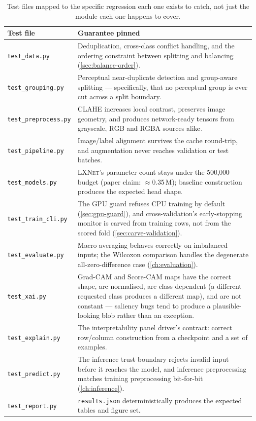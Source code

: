 \documentclass[11pt,a4paper,oneside]{report}
\newcommand{\LXNet}{\textsc{LXNet}}
\newcommand{\code}[1]{\texttt{\small #1}}
\begin{document}
\begin{table}[h]
\centering
\small
\begin{tabularx}{\linewidth}{@{}l X@{}}
\toprule
\textbf{Test file} & \textbf{Guarantee pinned} \\
\midrule
\code{test\_data.py} & Deduplication, cross-class conflict handling, and
  the ordering constraint between splitting and balancing
  (\cref{sec:balance-order}). \\
\code{test\_grouping.py} & Perceptual near-duplicate detection and
  group-aware splitting --- specifically, that no perceptual group is ever
  cut across a split boundary. \\
\code{test\_preprocess.py} & CLAHE increases local contrast, preserves
  image geometry, and produces network-ready tensors from grayscale, RGB
  and RGBA sources alike. \\
\code{test\_pipeline.py} & Image/label alignment survives the cache
  round-trip, and augmentation never reaches validation or test batches. \\
\code{test\_models.py} & \LXNet{}'s parameter count stays under the
  500{,}000 budget (paper claim: $\approx$0.35\,M); baseline construction
  produces the expected head shape. \\
\code{test\_train\_cli.py} & The GPU guard refuses CPU training by
  default (\cref{sec:gpu-guard}), and cross-validation's early-stopping
  monitor is carved from training rows, not from the scored fold
  (\cref{sec:carve-validation}). \\
\code{test\_evaluate.py} & Macro averaging behaves correctly on imbalanced
  inputs; the Wilcoxon comparison handles the degenerate all-zero-difference
  case (\cref{ch:evaluation}). \\
\code{test\_xai.py} & Grad-CAM and Score-CAM maps have the correct shape,
  are normalised, are class-dependent (a different requested class produces
  a different map), and are not constant --- saliency bugs tend to produce a
  plausible-looking blob rather than an exception. \\
\code{test\_explain.py} & The interpretability panel driver's contract:
  correct row/column construction from a checkpoint and a set of examples. \\
\code{test\_predict.py} & The inference trust boundary rejects invalid
  input before it reaches the model, and inference preprocessing matches
  training preprocessing bit-for-bit (\cref{ch:inference}). \\
\code{test\_report.py} & \texttt{results.json} deterministically produces
  the expected tables and figure set. \\
\bottomrule
\end{tabularx}
\caption{Test files mapped to the specific regression each one exists to
catch, not just the module each one happens to cover.}
\label{tab:test-map}
\end{table}
\end{document}
